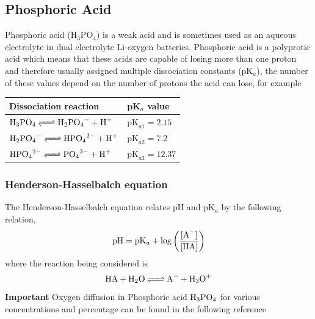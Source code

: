 \documentclass[12pt]{book}
\begin{document}
\subsection{Phosphoric Acid}
Phosphoric acid (H$_3$PO$_4$) is a weak acid and is sometimes used as an aqueous electrolyte in dual electrolyte Li-oxygen batteries. Phosphoric acid is a polyprotic acid which means that these acids are capable of losing more than one proton and therefore usually assigned multiple dissociation constants (pK$_a$), the number of these values depend on the number of protons the acid can lose, for example
\begin{center}
\begin{tabular}{ |l|l|}
 \hline
 Dissociation reaction& pK$_a$ value \\
\hline
$\ce{H3PO4 <=> H2PO4^- + H^+}$ & $\textrm{pK}_{a1}=2.15$\\
$\ce{H2PO4^- <=> HPO4^2- + H^+}$ & $\textrm{pK}_{a2}=7.2$\\
$\ce{HPO4^2- <=> PO4^3- + H^+}$ & $\textrm{pK}_{a3}=12.37$\\
\hline
\end{tabular}
\end{center}

\subsubsection{Henderson-Hasselbalch equation}
The Henderson-Hasselbalch equation relates pH and pK$_a$ by the following relation,
\begin{equation}
\ce{pH}=\ce{pK_a}+\log\left(\frac{\ce{[A^-]}}{\ce{[HA]}}\right)
\end{equation} 
where the reaction being considered is 
\begin{align}
\ce{HA + H2O <=> A^- + H3O^+}
\end{align}
{\color{red}\textbf{Important} Oxygen diffusion in Phosphoric acid $\ce{H3PO4}$ for various concentrations and percentage can be found in the following reference~\cite{Kinoshita1992}}
\end{document}
